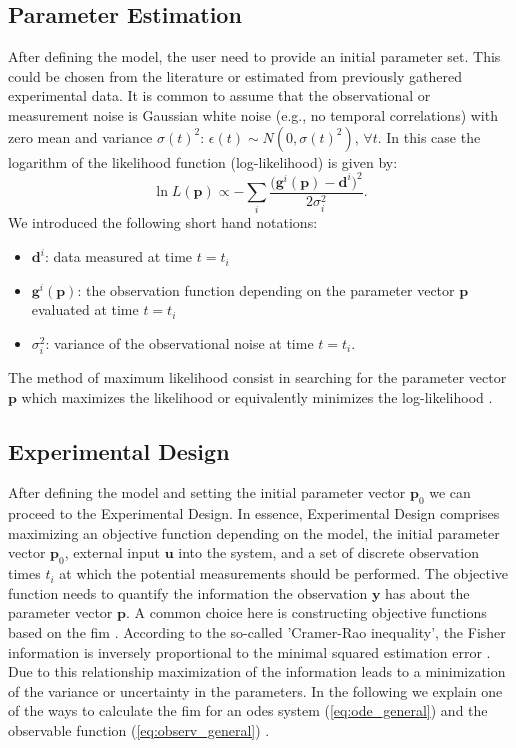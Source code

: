 \documentclass[10pt,A4paper]{article}
\newcommand{\mbu}{\mathbf{u}}
\newcommand{\mbp}{\mathbf{p}}
\newcommand{\mby}{\mathbf{y}}
\newcommand{\mbd}{\mathbf{d}}
\begin{document}
\subsection*{Parameter Estimation}
After defining the model, the user need to provide an initial parameter set.  
This could be chosen from the literature or estimated from previously gathered experimental data. 
It is common to assume that the observational or measurement noise is Gaussian white noise (e.g., no temporal correlations) with zero mean and variance $\sigma(t)^2$: $\epsilon(t) \sim N(0, \sigma(t)^2)$, $\forall t$. 
In this case the logarithm of the likelihood function (log-likelihood) is given by:
\begin{equation}
    \ln L(\mbp) \propto - \sum_{i}\frac{ \big(\mathbf{g}^{i}(\mbp) - \mbd^{i}\big)^2}{2 \sigma_{i}^2}.
    \label{eq:likelihood_Gaussian}
\end{equation}
We introduced the following short hand notations: 
\begin{itemize}
\item $\mbd^{i}$: data measured at time $t=t_i$
\item $\mathbf{g}^{i}(\mbp)$: the observation function depending on the parameter vector $\mbp$ evaluated at time $t=t_i$
\item $\sigma_{i}^2$: variance of the observational noise at time $t=t_i$.
\end{itemize}
The method of maximum likelihood consist in searching for the parameter vector $\mbp$ which maximizes the likelihood or equivalently minimizes the log-likelihood \cite{gaborRobustEfficient2015}. 

%
\subsection*{Experimental Design}
After defining the model and setting the initial parameter vector $\mbp_0$ we can proceed to the Experimental Design. 
In essence, Experimental Design comprises maximizing an objective function depending on the model, the initial parameter vector $\mbp_0$, external input $\mbu$ into the system, and a set of discrete observation times $t_i$ at which the potential measurements should be performed. 
The objective function needs to quantify the information the observation $\mby$ has about the parameter vector $\mbp$. 
A common choice here is constructing objective functions based on the \ac{fim} \cite{lyTutorialFisher2017}. 
According to the so-called 'Cramer-Rao inequality', the Fisher information is inversely proportional to the minimal squared estimation error \cite{friedenExploratoryData2010}. 
Due to this relationship maximization of the information leads to a minimization of the variance or uncertainty in the parameters. 
In the following we explain one of the ways to calculate the \acl{fim} for an \acp{ode} system (\ref{eq:ode_general}) and the observable function (\ref{eq:observ_general}) \cite{lyTutorialFisher2017}.
\end{document}
